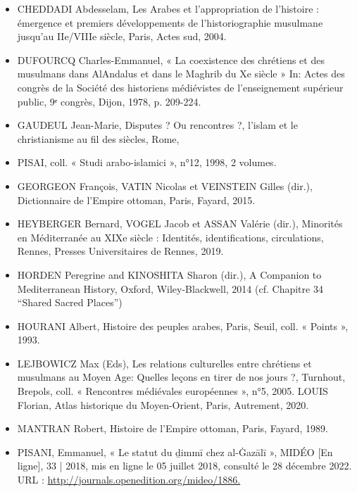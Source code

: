 \begin{itemize}
    \item   CHEDDADI Abdesselam, Les Arabes et l'appropriation de l'histoire : émergence et premiers développements de l'historiographie musulmane jusqu'au IIe/VIIIe siècle, Paris, Actes sud, 2004.   \item DUFOURCQ Charles-Emmanuel, « La coexistence des chrétiens et des musulmans dans AlAndalus et dans le Maghrib du Xe siècle » In: Actes des congrès de la Société des historiens médiévistes de l'enseignement supérieur public, 9ᵉ congrès, Dijon, 1978, p. 209-224.  
    
    \item GAUDEUL Jean-Marie, Disputes ? Ou rencontres ?, l’islam et le christianisme au fil des siècles, Rome,   \item PISAI, coll. « Studi arabo-islamici », n°12, 1998, 2 volumes.   \item GEORGEON François, VATIN Nicolas et VEINSTEIN Gilles (dir.), Dictionnaire de l’Empire ottoman, Paris, Fayard, 2015.   \item HEYBERGER Bernard, VOGEL Jacob et ASSAN Valérie (dir.), Minorités en Méditerranée au XIXe siècle : Identités, identifications, circulations, Rennes, Presses Universitaires de Rennes, 2019.    \item HORDEN Peregrine and KINOSHITA Sharon (dir.), A Companion to Mediterranean History, Oxford, Wiley-Blackwell, 2014 (cf. Chapitre 34 “Shared Sacred Places”)    \item HOURANI Albert, Histoire des peuples arabes, Paris, Seuil, coll. « Points », 1993.   \item LEJBOWICZ Max (Eds), Les relations culturelles entre chrétiens et musulmans au Moyen Age: Quelles leçons en tirer de nos jours ?, Turnhout, Brepols, coll. « Rencontres médiévales européennes », n°5, 2005.  LOUIS Florian, Atlas historique du Moyen-Orient, Paris, Autrement, 2020.   \item MANTRAN Robert, Histoire de l’Empire ottoman, Paris, Fayard, 1989.   \item PISANI, Emmanuel,  « Le statut du ḏimmī chez al-Ġazālī », MIDÉO [En ligne], 33 | 2018, mis en ligne le 05 juillet 2018, consulté le 28 décembre 2022. URL : \url{http://journals.openedition.org/mideo/1886.    }

\end{itemize}

